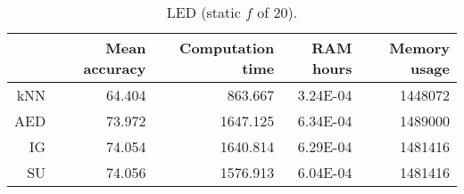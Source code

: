 \begin{table}[h]
\centering
\begin{tabular}{r|rrrr}	
    & Mean accuracy & Computation time & RAM hours & Memory usage \\ \hline
kNN & 64.404                   & 863.667          & 3.24E-04  & 1448072      \\
AED & 73.972                   & 1647.125         & 6.34E-04  & 1489000      \\
IG  & 74.054                   & 1640.814         & 6.29E-04  & 1481416      \\
SU  & 74.056                   & 1576.913         & 6.04E-04  & 1481416     
\end{tabular}
\caption{LED (static $f$ of 20).}
\label{Table:LED20}
\end{table}